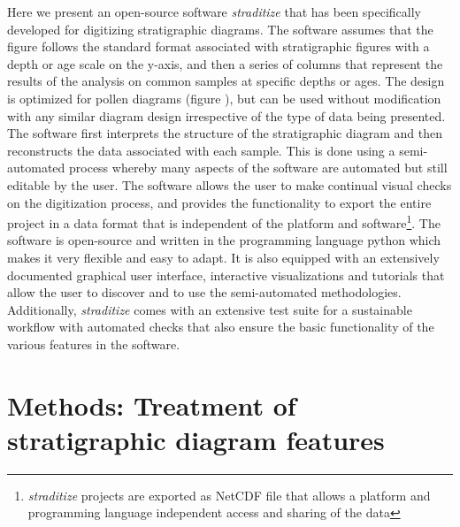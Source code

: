 \documentclass[
11pt, %
english, %
singlespacing, %
headsepline, %
]{MastersDoctoralThesis} %
\begin{document}
\begin{NoHyper}
\begin{refsection}
Here we present an open-source software \emph{straditize} \citep{SommerRechChevalierEtAl2019} that has been specifically developed for digitizing stratigraphic diagrams. The software assumes that the figure follows the standard format associated with stratigraphic figures with a depth or age scale on the y-axis, and then a series of columns that represent the results of the analysis on common samples at specific depths or ages. The design is optimized for pollen diagrams (figure \samplediagram), but can be used without modification with any similar diagram design irrespective of the type of data being presented. The software first interprets the structure of the stratigraphic diagram and then reconstructs the data associated with each sample. This is done using a semi-automated process whereby many aspects of the software are automated but still editable by the user. The software allows the user to make continual visual checks on the digitization process, and provides the functionality to export the entire project in a data format that is independent of the platform and software\footnote{\emph{straditize} projects are exported as NetCDF file \citep{RewDavisEmmersonEtAl1989} that allows a platform and programming language independent access and sharing of the data}. The software is open-source and written in the programming language python \citep{PerezGrangerHunter2011} which makes it very flexible and easy to adapt. It is also equipped with an extensively documented graphical user interface, interactive visualizations and tutorials that allow the user to discover and to use the semi-automated methodologies. Additionally, \emph{straditize} comes with an extensive test suite for a sustainable workflow with automated checks that also ensure the basic functionality of the various features in the software.

\section{Methods: Treatment of stratigraphic diagram features}  \label{sec:straditize-methods}


\end{refsection}
\end{NoHyper}
\end{document}
